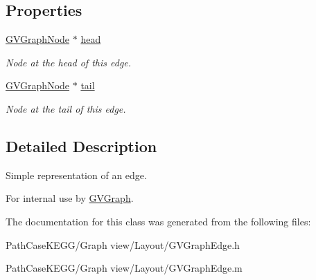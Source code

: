 \subsection*{Properties}
\begin{DoxyCompactItemize}
\item 
\hypertarget{interface_g_v_graph_edge_a6949a87dc9c433e3ff70880b16ff9251}{
\hyperlink{interface_g_v_graph_node}{GVGraphNode} $\ast$ \hyperlink{interface_g_v_graph_edge_a6949a87dc9c433e3ff70880b16ff9251}{head}}
\label{interface_g_v_graph_edge_a6949a87dc9c433e3ff70880b16ff9251}

\begin{DoxyCompactList}\small\item\em Node at the head of this edge. \end{DoxyCompactList}\item 
\hypertarget{interface_g_v_graph_edge_ab74983e48a1e21fbdc4f847fbac81770}{
\hyperlink{interface_g_v_graph_node}{GVGraphNode} $\ast$ \hyperlink{interface_g_v_graph_edge_ab74983e48a1e21fbdc4f847fbac81770}{tail}}
\label{interface_g_v_graph_edge_ab74983e48a1e21fbdc4f847fbac81770}

\begin{DoxyCompactList}\small\item\em Node at the tail of this edge. \end{DoxyCompactList}\end{DoxyCompactItemize}


\subsection{Detailed Description}
Simple representation of an edge. 

For internal use by \hyperlink{interface_g_v_graph}{GVGraph}. 

The documentation for this class was generated from the following files:\begin{DoxyCompactItemize}
\item 
PathCaseKEGG/Graph view/Layout/GVGraphEdge.h\item 
PathCaseKEGG/Graph view/Layout/GVGraphEdge.m\end{DoxyCompactItemize}
